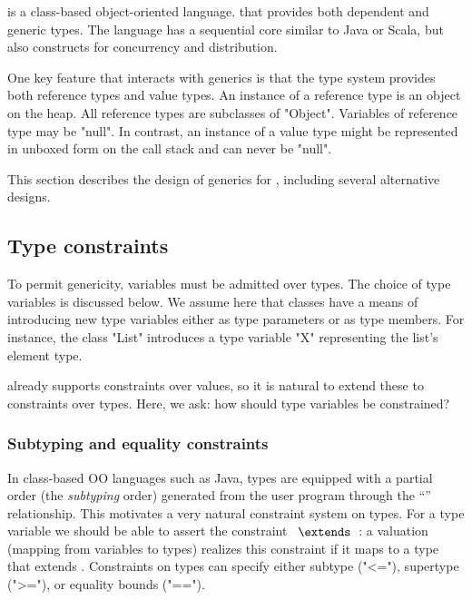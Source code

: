 \Xten{} is a class-based object-oriented language.
that provides both dependent and generic types.
The language has a sequential core similar to Java or Scala, but
also
constructs for concurrency and distribution.

One key feature that interacts with generics is that the type
system provides both reference types and value types.
An instance of a reference type is an object on the
heap.  All reference types are subclasses of \xcd"Object".
Variables of reference type may be \xcd"null".
In contrast, an instance of a value type might be represented in
unboxed form on the call stack
and can never be \xcd"null".

This section describes the design of generics for \Xten,
including several alternative designs.



\subsection{Type constraints}

To permit genericity, variables  must be admitted over types.
The choice of type variables is discussed below.  We assume here
that classes have a means of introducing new type variables
either as type parameters or as type members.
For instance,
the class \xcd"List" introduces a type variable \xcd"X"
representing the list's element type.

\Xten already supports constraints over values, so it is natural
to extend these to constraints over types.
Here, we ask: how should type variables be constrained?

\subsubsection{Subtyping and equality constraints}

In class-based OO languages such as Java,
types are equipped with a partial
order (the \emph{subtyping} order) generated from the user program
through the ``'' relationship.  
This motivates a very natural constraint system on types.  For a type
variable  we should be able to assert the constraint
~$\extends$~: a valuation (mapping from variables to types) realizes
this constraint if it maps  to a type that extends .
Constraints on types can specify either subtype (\xcd"<="),
supertype (\xcd">="), or equality bounds (\xcd"==").

